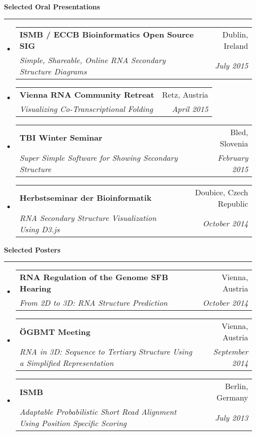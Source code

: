 \documentclass[letterpaper,11pt]{article}
\makeatletter
\newcommand{\resheading}[1]{{\normalsize {\textbf{#1 \vphantom{p\^{E}}}}}}
\newcommand{\ressubheading}[4]{
\begin{tabular*}{6.5in}{l@{\extracolsep{\fill}}r}
		\textbf{#1} & #2 \\
		\textit{#3} & \textit{#4} \\
\end{tabular*}\vspace{-6pt}}
\makeatother
\begin{document}
\resheading{Selected Oral Presentations}
\hrule
\begin{itemize}
  \item
  \ressubheading{ISMB / ECCB Bioinformatics Open Source SIG}{Dublin, Ireland}{Simple, Shareable, Online RNA Secondary Structure Diagrams}{July 2015}
  
  \item
  \ressubheading{Vienna RNA Community Retreat}{Retz, Austria}{Visualizing Co-Transcriptional Folding}{April 2015}
 
  \item
  \ressubheading{TBI Winter Seminar}{Bled, Slovenia}{Super Simple Software for Showing Secondary Structure}{February 2015}
 
  \item
  \ressubheading{Herbstseminar der Bioinformatik}{Doubice, Czech Republic}{RNA Secondary Structure Visualization Using D3.js}{October 2014} 
   
 \end{itemize}
 
 \resheading{Selected Posters}
\hrule

\begin{itemize}

\item
  \ressubheading{RNA Regulation of the Genome SFB Hearing}{Vienna, Austria}{From 2D to 3D: RNA Structure Prediction}{October 2014}

\item
  \ressubheading{{\"O}GBMT Meeting}{Vienna, Austria}{RNA in 3D: Sequence to Tertiary Structure Using a Simplified Representation}{September 2014}  

\item
  \ressubheading{ISMB}{Berlin, Germany}{Adaptable Probabilistic Short Read Alignment Using Position Specific Scoring}{July 2013}  
    
 

  

\end{itemize}
\end{document}
